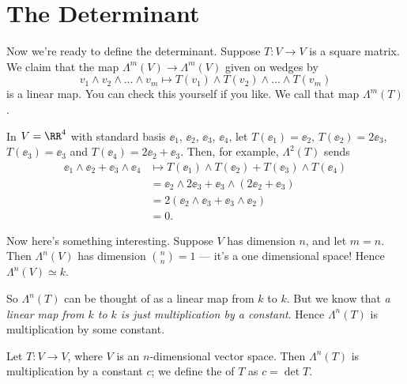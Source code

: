 \section{The Determinant}
Now we're ready to define the determinant.
Suppose $T : V \to V$ is a square matrix.
We claim that the map $\Lambda^m(V) \to \Lambda^m(V)$ given on wedges by
\[ v_1 \wedge v_2 \wedge \dots \wedge v_m
	\mapsto T(v_1) \wedge T(v_2) \wedge \dots \wedge T(v_m) \]
is a linear map.
You can check this yourself if you like.
We call that map $\Lambda^m(T)$.
\begin{example}
	In $V = \RR^4$ with standard basis $\ee_1$, $\ee_2$, $\ee_3$, $\ee_4$,
	let $T(\ee_1) = \ee_2$, $T(\ee_2) = 2\ee_3$, $T(\ee_3) = \ee_3$ and $T(\ee_4) = 2\ee_2 + \ee_3$.
	Then, for example, $\Lambda^2(T)$ sends
	\begin{align*}
		\ee_1 \wedge \ee_2 + \ee_3 \wedge \ee_4
		&\mapsto T(\ee_1) \wedge T(\ee_2) + T(\ee_3) \wedge T(\ee_4) \\
		&= \ee_2 \wedge 2\ee_3 + \ee_3 \wedge (2\ee_2 + \ee_3) \\
		&= 2(\ee_2 \wedge \ee_3 + \ee_3\wedge \ee_2) \\
		&= 0.
	\end{align*}
\end{example}

Now here's something interesting.
Suppose $V$ has dimension $n$, and let $m=n$.
Then $\Lambda^n(V)$ has dimension $\binom nn = 1$ --- it's a one dimensional space!
Hence $\Lambda^n(V) \simeq k$.

So $\Lambda^n(T)$ can be thought of as a linear map from $k$ to $k$.
But we know that \emph{a linear map from $k$ to $k$ is just multiplication by a constant}.
Hence $\Lambda^n(T)$ is multiplication by some constant.
\begin{definition}
	Let $T : V \to V$, where $V$ is an $n$-dimensional vector space.
	Then $\Lambda^n(T)$ is multiplication by a constant $c$;
	we define the  of $T$ as $c = \det T$.
\end{definition}

